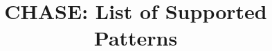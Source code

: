 \documentclass[journal]{IEEEtran}
\begin{document}
\title{CHASE: List of Supported Patterns
}
%
\end{document}
